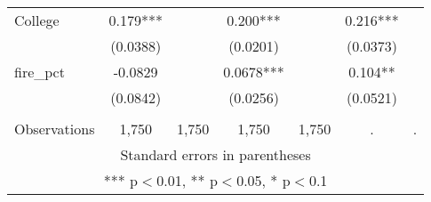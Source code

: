 \begin{tabular}{lcccccc}
College & 0.179*** &  & 0.200*** &  & 0.216*** &  \\
 & (0.0388) &  & (0.0201) &  & (0.0373) &  \\
fire\_pct & -0.0829 &  & 0.0678*** &  & 0.104** &  \\
 & (0.0842) &  & (0.0256) &  & (0.0521) &  \\
 &  &  &  &  &  &  \\
 Observations & 1,750 & 1,750 & 1,750 & 1,750 & . & . \\ \hline
\multicolumn{7}{c}{ Standard errors in parentheses} \\
\multicolumn{7}{c}{ *** p$<$0.01, ** p$<$0.05, * p$<$0.1} \\
\end{tabular}
